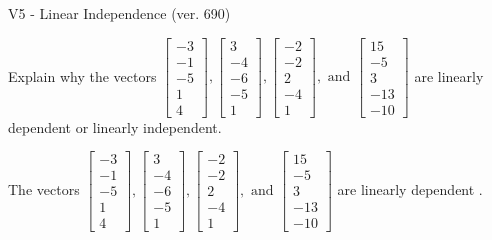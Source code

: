 \begin{exercise}
  \begin{exerciseTitle}V5 - Linear Independence (ver. 690)\end{exerciseTitle}
  \begin{exerciseStatement}
    Explain why the vectors \(\left[\begin{array}{r}
-3 \\
-1 \\
-5 \\
1 \\
4
\end{array}\right] , \left[\begin{array}{r}
3 \\
-4 \\
-6 \\
-5 \\
1
\end{array}\right] , \left[\begin{array}{r}
-2 \\
-2 \\
2 \\
-4 \\
1
\end{array}\right] , \text{ and } \left[\begin{array}{r}
15 \\
-5 \\
3 \\
-13 \\
-10
\end{array}\right]\) are linearly dependent or linearly independent.	


  \end{exerciseStatement}
  \begin{exerciseAnswer}
   The vectors \(\left[\begin{array}{r}
-3 \\
-1 \\
-5 \\
1 \\
4
\end{array}\right] , \left[\begin{array}{r}
3 \\
-4 \\
-6 \\
-5 \\
1
\end{array}\right] , \left[\begin{array}{r}
-2 \\
-2 \\
2 \\
-4 \\
1
\end{array}\right] , \text{ and } \left[\begin{array}{r}
15 \\
-5 \\
3 \\
-13 \\
-10
\end{array}\right]\) are 
  	 linearly dependent  .
  


  \end{exerciseAnswer}
\end{exercise}